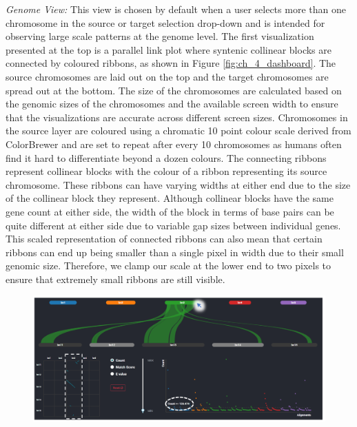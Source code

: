 \textit{Genome View:}
This view is chosen by default when a user selects more than one chromosome in the source or target selection drop-down and is intended for observing large scale patterns at the genome level.
The first visualization presented at the top is a parallel link plot where syntenic collinear blocks are connected by coloured ribbons, as shown in Figure \ref{fig:ch_4_dashboard}. The source chromosomes are laid out on the top and the target chromosomes are spread out at the bottom. The size of the chromosomes are calculated based on the genomic sizes of the chromosomes and the available screen width to ensure that the visualizations are accurate across different screen sizes. Chromosomes in the source layer are coloured using a chromatic 10 point colour scale derived from ColorBrewer\cite{colorbrewer} and are set to repeat after every 10 chromosomes as humans often find it hard to differentiate beyond a dozen colours\cite{ware2012information}. The connecting ribbons represent collinear blocks with the colour of a ribbon representing its source chromosome. These ribbons can have varying widths at either end due to the size of the collinear block they represent. Although collinear blocks have the same gene count at either side, the width of the block in terms of base pairs can be quite different at either side due to variable gap sizes between individual genes. This scaled representation of connected ribbons can also mean that certain ribbons can end up being smaller than a single pixel in width due to their small genomic size. Therefore, we clamp our scale at the lower end to two pixels to ensure that extremely small ribbons are still visible.


\begin{figure}
  \centering
  \includegraphics[width=1\linewidth]{images/ch_5_genome_view_2.PNG}
  \label{fig:ch_5_genome_view_2}
\end{figure} 


